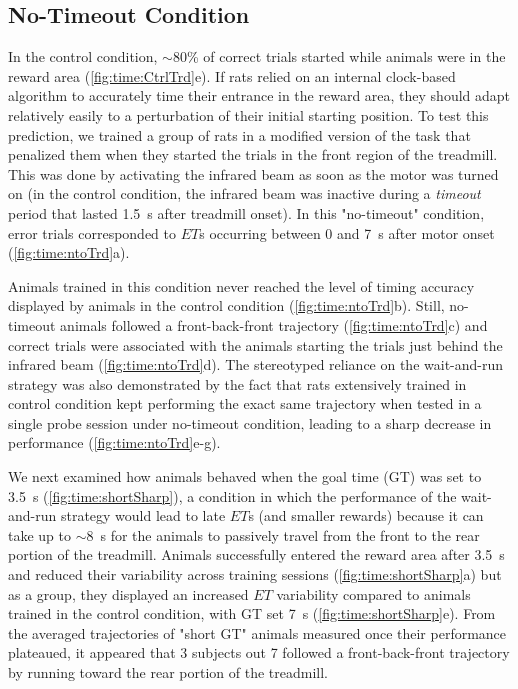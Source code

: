 \subsection{No-Timeout Condition}
\label{ch:time:nto}

In the control condition, $\sim$80\% of correct trials started while animals were in the reward area (\autoref{fig:time:CtrlTrd}e).
If rats relied on an internal clock-based algorithm to accurately time their entrance in the reward area, they should adapt relatively easily to a perturbation of their initial starting position.
To test this prediction, we trained a group of rats in a modified version of the task that penalized them when they started the trials in the front region of the treadmill.
This was done by activating the infrared beam as soon as the motor was turned on (in the control condition, the infrared beam was inactive during a \textit{timeout} period that lasted 1.5~s after treadmill onset).
In this "no-timeout" condition, error trials corresponded to $ET$s occurring between 0 and 7~s after motor onset (\autoref{fig:time:ntoTrd}a).

Animals trained in this condition never reached the level of timing accuracy displayed by animals in the control condition (\autoref{fig:time:ntoTrd}b).
Still, no-timeout animals followed a front-back-front trajectory (\autoref{fig:time:ntoTrd}c) and correct trials were associated with the animals starting the trials just behind the infrared beam (\autoref{fig:time:ntoTrd}d).
The stereotyped reliance on the wait-and-run strategy was also demonstrated by the fact that rats extensively trained in control condition kept performing the exact same trajectory when tested in a single probe session under no-timeout condition, leading to a sharp decrease in performance (\autoref{fig:time:ntoTrd}e-g).
\par

We next examined how animals behaved when the goal time (GT) was set to 3.5~s (\autoref{fig:time:shortSharp}), a condition in which the performance of the wait-and-run strategy would lead to late $ET$s (and smaller rewards) because it can take up to $\sim$8~s for the animals to passively travel from the front to the rear portion of the treadmill.
Animals successfully entered the reward area after 3.5~s and reduced their variability across training sessions (\autoref{fig:time:shortSharp}a) but as a group, they displayed an increased $ET$ variability compared to animals trained in the control condition, with GT set 7~s (\autoref{fig:time:shortSharp}e).
From the averaged trajectories of "short GT" animals measured once their performance plateaued, it appeared that 3 subjects out 7 followed a front-back-front trajectory by running toward the rear portion of the treadmill.
